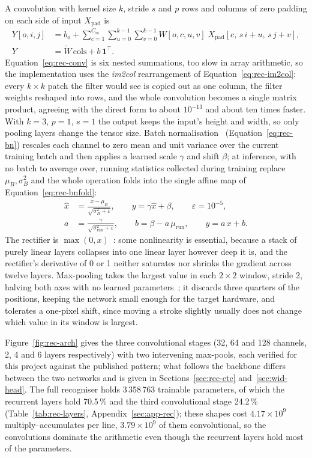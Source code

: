 A convolution with kernel size $k$, stride $s$ and $p$ rows and columns of zero padding on each side of input $X_{\mathrm{pad}}$ is
\begin{align}
Y[o,i,j]&=b_o+\sum_{c=1}^{C_{\mathrm{in}}}\sum_{u=0}^{k-1}\sum_{v=0}^{k-1}W[o,c,u,v]\;X_{\mathrm{pad}}[c,\,s\,i+u,\,s\,j+v],\label{eq:rec-conv}\\
Y&=\tilde W\,\mathrm{cols}+b\,\mathbf 1^{\top}.\label{eq:rec-im2col}
\end{align}
Equation~\ref{eq:rec-conv} is six nested summations, too slow in array arithmetic, so the implementation uses the \emph{im2col} rearrangement of Equation~\ref{eq:rec-im2col}: every $k\times k$ patch the filter would see is copied out as one column, the filter weights reshaped into rows, and the whole convolution becomes a single matrix product, agreeing with the direct form to about $10^{-13}$ and about ten times faster. With $k=3$, $p=1$, $s=1$ the output keeps the input's height and width, so only pooling layers change the tensor size. Batch normalisation~\cite[Alg.~1]{ioffe2015} (Equation~\ref{eq:rec-bn}) rescales each channel to zero mean and unit variance over the current training batch and then applies a learned scale $\gamma$ and shift $\beta$; at inference, with no batch to average over, running statistics collected during training replace $\mu_B,\sigma_B^2$ and the whole operation folds into the single affine map of Equation~\ref{eq:rec-bnfold}:
\begin{align}
\hat x&=\frac{x-\mu_B}{\sqrt{\sigma_B^2+\varepsilon}},\qquad y=\gamma\hat x+\beta,\qquad\varepsilon=10^{-5},\label{eq:rec-bn}\\
a&=\frac{\gamma}{\sqrt{\sigma^2_{\mathrm{run}}+\varepsilon}},\qquad b=\beta-a\,\mu_{\mathrm{run}},\qquad y=a\,x+b.\label{eq:rec-bnfold}
\end{align}
The rectifier is $\max(0,x)$~\cite[p.~807]{nair2010}: some nonlinearity is essential, because a stack of purely linear layers collapses into one linear layer however deep it is, and the rectifier's derivative of 0 or 1 neither saturates nor shrinks the gradient across twelve layers. Max-pooling takes the largest value in each $2\times2$ window, stride 2, halving both axes with no learned parameters~\cite{ji2021}; it discards three quarters of the positions, keeping the network small enough for the target hardware, and tolerates a one-pixel shift, since moving a stroke slightly usually does not change which value in its window is largest.

Figure~\ref{fig:rec-arch} gives the three convolutional stages (32, 64 and 128 channels, 2, 4 and 6 layers respectively) with two intervening max-pools, each verified for this project against the published pattern; what follows the backbone differs between the two networks and is given in Sections~\ref{sec:rec-ctc} and~\ref{sec:wid-head}. The full recogniser holds 3\,358\,763 trainable parameters, of which the recurrent layers hold 70.5\,\% and the third convolutional stage 24.2\,\% (Table~\ref{tab:rec-layers}, Appendix~\ref{sec:app-rec}); these shapes cost $4.17\times10^9$ multiply--accumulates per line, $3.79\times10^9$ of them convolutional, so the convolutions dominate the arithmetic even though the recurrent layers hold most of the parameters.


